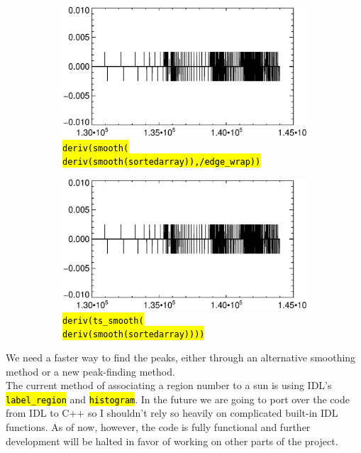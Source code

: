 \documentclass[10pt]{scrartcl}
\begin{document}
\begin{figure}[!h]
\begin{center}
   \begin{subfigure}[b]{.49\textwidth}
        \centering
        \includegraphics[width=1.\textwidth]{../plots_tables_images/sm_justsmooth.eps}
        \caption{\hl{\texttt{deriv(smooth(\\
        deriv(smooth(sortedarray)),/edge\_wrap))}}}
    \end{subfigure}
    \begin{subfigure}[b]{.49\textwidth}
        \centering
        \includegraphics[width=1.\textwidth]{../plots_tables_images/sm_doubletssmooth.eps}
        \caption{\hl{\texttt{deriv(ts\_smooth(\\
        deriv(smooth(sortedarray))))}}}
    \end{subfigure}
    \caption{}    
    \label{badsmooth}
    \end{center}
\end{figure}

We need a faster way to find the peaks, either through an alternative smoothing method or a new peak-finding method.\\

The current method of associating a region number to a sun is using IDL's \hl{\texttt{label\_region}} and \hl{\texttt{histogram}}. In the future we are going to port over the code from IDL to C++ so I shouldn't rely so heavily on complicated built-in IDL functions. As of now, however, the code is fully functional and further development will be halted in favor of working on other parts of the project. \\
\end{document}
